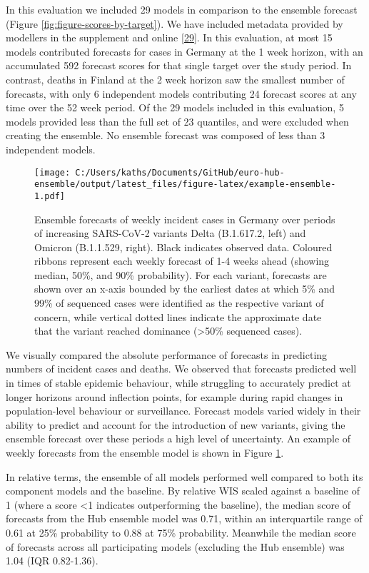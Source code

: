 \documentclass[
]{article}
\begin{document}
In this evaluation we included 29 models in comparison to the ensemble forecast (Figure \ref{fig:figure-scores-by-target}). We have included metadata provided by modellers in the supplement and online \protect\hyperlink{ref-katharine_sherratt_2022_7356267}{{[}29{]}}. In this evaluation, at most 15 models contributed forecasts for cases in Germany at the 1 week horizon, with an accumulated 592 forecast scores for that single target over the study period. In contrast, deaths in Finland at the 2 week horizon saw the smallest number of forecasts, with only 6 independent models contributing 24 forecast scores at any time over the 52 week period. Of the 29 models included in this evaluation, 5 models provided less than the full set of 23 quantiles, and were excluded when creating the ensemble. No ensemble forecast was composed of less than 3 independent models.

\begin{figure}
\centering
\texttt{[image: C:/Users/kaths/Documents/GitHub/euro-hub-ensemble/output/latest\_files/figure-latex/example-ensemble-1.pdf]}
\caption{\label{fig:example-ensemble}Ensemble forecasts of weekly incident cases in Germany over periods of increasing SARS-CoV-2 variants Delta (B.1.617.2, left) and Omicron (B.1.1.529, right). Black indicates observed data. Coloured ribbons represent each weekly forecast of 1-4 weeks ahead (showing median, 50\%, and 90\% probability). For each variant, forecasts are shown over an x-axis bounded by the earliest dates at which 5\% and 99\% of sequenced cases were identified as the respective variant of concern, while vertical dotted lines indicate the approximate date that the variant reached dominance (\textgreater50\% sequenced cases).}
\end{figure}

We visually compared the absolute performance of forecasts in predicting numbers of incident cases and deaths. We observed that forecasts predicted well in times of stable epidemic behaviour, while struggling to accurately predict at longer horizons around inflection points, for example during rapid changes in population-level behaviour or surveillance. Forecast models varied widely in their ability to predict and account for the introduction of new variants, giving the ensemble forecast over these periods a high level of uncertainty. An example of weekly forecasts from the ensemble model is shown in Figure \ref{fig:example-ensemble}.

In relative terms, the ensemble of all models performed well compared to both its component models and the baseline. By relative WIS scaled against a baseline of 1 (where a score \textless1 indicates outperforming the baseline), the median score of forecasts from the Hub ensemble model was 0.71, within an interquartile range of 0.61 at 25\% probability to 0.88 at 75\% probability. Meanwhile the median score of forecasts across all participating models (excluding the Hub ensemble) was 1.04 (IQR 0.82-1.36).
\end{document}

